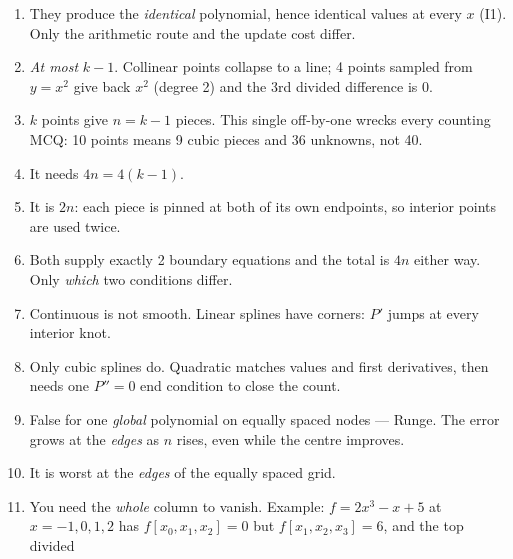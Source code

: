 \begin{trapbox}
\begin{enumerate}
\item {}
      They produce the \emph{identical} polynomial, hence identical values at every $x$
      (I1). Only the arithmetic route and the update cost differ.
\item {}
      \emph{At most} $k-1$. Collinear points collapse to a line; 4 points sampled from
      $y=x^2$ give back $x^2$ (degree 2) and the 3rd divided difference is $0$.
\item {}
      $k$ points give $n=k-1$ pieces. This single off-by-one wrecks every counting MCQ:
      10 points means 9 cubic pieces and 36 unknowns, not 40.
\item {}
      It needs $4n=4(k-1)$.
\item {}
      It is $2n$: each piece is pinned at both of its own endpoints, so interior points
      are used twice.
\item {}
      Both supply exactly 2 boundary equations and the total is $4n$ either way. Only
      \emph{which} two conditions differ.
\item {}
      Continuous is not smooth. Linear splines have corners: $P'$ jumps at every interior
      knot.
\item {}
      Only cubic splines do. Quadratic matches values and first derivatives, then needs
      one $P''=0$ end condition to close the count.
\item {}
      False for one \emph{global} polynomial on equally spaced nodes --- Runge. The error
      grows at the \emph{edges} as $n$ rises, even while the centre improves.
\item {}
      It is worst at the \emph{edges} of the equally spaced grid.
\item {}
      You need the \emph{whole} column to vanish. Example: $f=2x^3-x+5$ at
      $x=-1,0,1,2$ has $f[x_0,x_1,x_2]=0$ but $f[x_1,x_2,x_3]=6$, and the top divided

\end{enumerate}
\end{trapbox}
